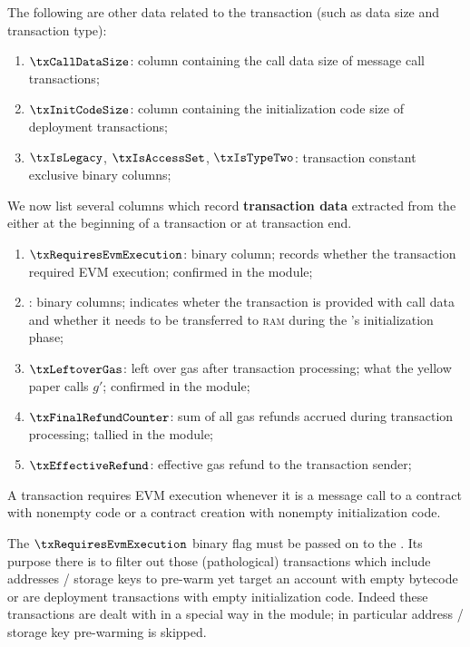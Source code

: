 The following are other data related to the transaction (such as data size and transaction type):
\begin{enumerate}[resume]
	\item $\txCallDataSize$:
		\markAsExtractedFromRlpTxn{}
		column containing the call data size of message call transactions;
	\item $\txInitCodeSize$:
		\markAsExtractedFromRlpTxn{}
		column containing the initialization code size of deployment transactions;
	\item $\txIsLegacy$, $\txIsAccessSet$, $\txIsTypeTwo$:
		\markAsExtractedFromRlpTxn{}
		transaction constant exclusive binary columns;
\end{enumerate}
We now list several columns which record \textbf{transaction data} extracted from the \hubMod{} either at the beginning of a transaction or at transaction end.
\begin{enumerate}[resume]
	\item $\txRequiresEvmExecution$:
		\markAsComputedHere{}
		\markAsExtractedFromHub{}
		\partiallyGodGiven{}
		binary column; records whether the transaction required \textsc{EVM} execution;  confirmed in the \hubMod{} module;
	\item \txCopyTxcd{}:
		\markAsComputedHere{}
		binary columns;
		indicates wheter the transaction is provided with call data and whether it needs to be transferred to \textsc{ram} during the \hubMod{}'s initialization phase;
	\item $\txLeftoverGas$:
		\markAsExtractedFromHub{}
		\godGiven{}
		left over gas after transaction processing; what the yellow paper calls $g'$; confirmed in the \hubMod{} module;
	\item $\txFinalRefundCounter$:
		\markAsExtractedFromHub{}
		\godGiven{}
		sum of all gas refunds accrued during transaction processing; tallied in the \hubMod{} module;
	\item $\txEffectiveRefund$:
		\markAsComputedHere{}
		effective gas refund to the transaction sender;
\end{enumerate}
\saNote{} A transaction requires \textsc{EVM} execution whenever it is a message call to a contract with nonempty code or a contract creation with nonempty initialization code.

\saNote{} The $\txRequiresEvmExecution$ binary flag must be passed on to the \rlpTxnMod{}. Its purpose there is to filter out those (pathological) transactions which include addresses / storage keys to pre-warm yet target an account with empty bytecode or are deployment transactions with empty initialization code. Indeed these transactions are dealt with in a special way in the \hubMod{} module; in particular address / storage key pre-warming is skipped.

